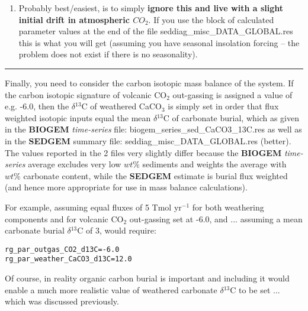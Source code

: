 \begin{enumerate}
\vspace{1mm}
\setcounter{enumi}{3}
\item Probably best/easiest, is to simply \textbf{ignore this and live with a slight initial drift in atmospheric \(CO_{2}\)}. If you use the block of calculated parameter values at the end of the file \textsf{\footnotesize seddiag\_misc\_DATA\_GLOBAL.res} this is what you will get (assuming you have seasonal insolation forcing -- the problem does not exist if there is no seasonality).
\end{enumerate}

\vspace{1mm}
\noindent\rule{4cm}{0.5pt}
\vspace{2mm}

\noindent Finally, you need to consider the carbon isotopic mass balance of the system. If the carbon isotopic signature of volcanic CO$_{2}$ out-gassing is assigned a value of e.g. -6.0\permille, then the $\delta$$^{13}$C of weathered CaCO$_{3}$ is  simply set in order that flux weighted isotopic  inputs equal the mean $\delta$$^{13}$C of carbonate burial, which as given in the \textbf{BIOGEM} \textit{time-series} file: \textsf{\footnotesize biogem\_series\_sed\_CaCO3\_13C.res} as well as in the \textbf{SEDGEM} summary file: \textsf{\footnotesize seddiag\_misc\_DATA\_GLOBAL.res} (better). The values reported in the 2 files very slightly differ because the \textbf{BIOGEM} \textit{time-series} average excludes very low \(wt\%\) sediments and weights the average with \(wt\%\) carbonate content, while the \textbf{SEDGEM} estimate is burial flux weighted (and hence more appropriate for use in mass balance calculations).

\vspace{1mm}
For example, assuming equal fluxes of 5 Tmol yr$^{-1}$ for both weathering components and for volcanic CO$_{2}$ out-gassing set at -6.0\permille, and ... assuming a mean carbonate burial $\delta$$^{13}$C of 3\permille, would require:
\vspace{-1mm}\small\begin{verbatim}
rg_par_outgas_CO2_d13C=-6.0
rg_par_weather_CaCO3_d13C=12.0
\end{verbatim}\normalsize\vspace{-1mm}
Of course, in reality organic carbon burial is important and including it would enable a much more realistic value of weathered carbonate $\delta$$^{13}$C to be set ... which was discussed previously.

